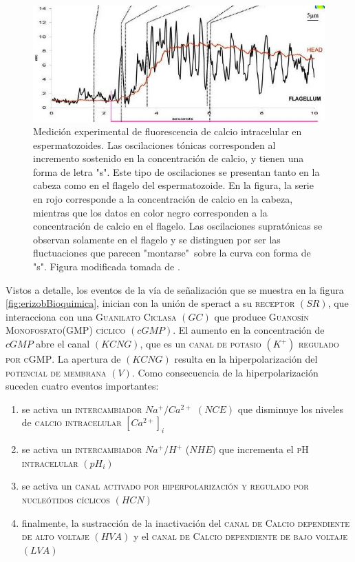 \begin{figure}[hbt]
\includegraphics[width=0.9\linewidth]{gfx/maderaSperact}
\caption[Medición experimental de calcio intracelular]{Medición experimental de fluorescencia de calcio intracelular en espermatozoides. Las oscilaciones tónicas corresponden al incremento sostenido en la concentración de calcio, y tienen una forma de letra "s". Este tipo de oscilaciones se presentan tanto en la cabeza como en el flagelo del espermatozoide. En la figura, la serie en rojo corresponde a la concentración de calcio en la cabeza, mientras que los datos en color negro corresponden a la concentración de calcio en el flagelo. Las oscilaciones supratónicas se observan solamente en el flagelo y se distinguen por ser las fluctuaciones que parecen "montarse"\ sobre la curva con forma de "s". Figura modificada tomada de \citeauthor{Wood2003} \citep{Wood2003}.}\label{fig:fluorescencia}
\end{figure}


Vistos a detalle, los eventos de la vía de señalización que se muestra en la figura \ref{fig:erizobBioquimica}, inician con la unión de speract a su \textsc{receptor} $(SR)$, que interacciona con una \textsc{Guanilato Ciclasa} $(GC)$ que produce \textsc{Guanosín Monofosfato(GMP) cíclico} $(cGMP)$. El aumento en la concentración de $cGMP$ abre el canal $(KCNG)$, que es un \textsc{canal de potasio} $(K^+)$ \textsc{regulado por cGMP}. La apertura de $(KCNG)$ resulta en la hiperpolarización del \textsc{potencial de membrana} $(V)$. Como consecuencia de la hiperpolarización suceden cuatro eventos importantes: \begin{enumerate}
\item se activa un \textsc{intercambiador} $Na^+/Ca^{2+}$ $(NCE)$ que disminuye los niveles de \textsc{calcio intracelular} $[Ca^{2+}]_i$
\item se activa un \textsc{intercambiador} $Na^+/H^+$ ($NHE)$ que incrementa el \textsc{pH intracelular} $(pH_i)$
\item se activa un \textsc{canal activado por hiperpolarización y regulado por nucleótidos cíclicos} $(HCN)$
\item finalmente, la sustracción de la inactivación del \textsc{canal de Calcio dependiente de alto voltaje} $(HVA)$ y el \textsc{canal de Calcio dependiente de bajo voltaje} $(LVA)$
\end{enumerate}

